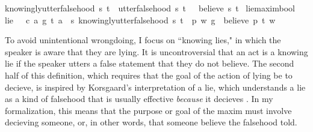 \begin{isabellebody}
{\isachardoublequoteopen}knowingly{\isacharunderscore}utter{\isacharunderscore}falsehood\ s\ t\ {\isasymequiv}\ {\isacharparenleft}utter{\isacharunderscore}falsehood\ s\ t{\isacharparenright}\ \isactrlbold {\isasymand}\ {\isacharparenleft}\isactrlbold {\isasymnot}\ {\isacharparenleft}believe\ s\ t{\isacharparenright}{\isacharparenright}{\isachardoublequoteclose}\isanewline
%
\isanewline
\isanewline
{}\isamarkupfalse%
\ lie{\isacharcolon}{\isacharcolon}{\isachardoublequoteopen}maxim{\isasymRightarrow}bool{\isachardoublequoteclose}\ \ \isanewline
{\isachardoublequoteopen}lie\ {\isasymequiv}\ {\isasymlambda}\ {\isacharparenleft}c{\isacharcomma}\ a{\isacharcomma}\ g{\isacharparenright}{\isachardot}\ {\isasymexists}t{\isachardot}\ {\isacharparenleft}a\ \isactrlbold {\isasymlongrightarrow}\ {\isacharparenleft}{\isasymlambda}s{\isachardot}\ knowingly{\isacharunderscore}utter{\isacharunderscore}falsehood\ s\ t{\isacharparenright}{\isacharparenright}\ {\isasymand}\ {\isacharparenleft}{\isasymexists}p{\isachardot}\ {\isasymforall}w{\isachardot}\ {\isacharparenleft}g\ \isactrlbold {\isasymrightarrow}\ believe\ p\ t{\isacharparenright}\ w{\isacharparenright}{\isachardoublequoteclose}\isanewline
%
%
\begin{isamarkuptext}%
To avoid unintentional wrongdoing, I focus on ``knowing lies," 
in which the speaker is aware that they are lying. It is uncontroversial that an act is a knowing lie
if the speaker utters a false statement that they do not believe. The second half of this definition, which 
requires that the goal of the action of lying be to decieve, is inspired by  Korsgaard's interpretation 
of a lie, which understands a lie as a kind of falsehood that is usually effective \emph{because} it decieves
\citep[4]{KorsgaardRTL}. In my formalization, this means that the purpose or goal of the maxim must
involve decieving someone, or, in other words, that someone believe the falsehood told.%
\end{isamarkuptext}\isamarkuptrue%
%
\begin{isamarkuptext}%

\end{isamarkuptext}
\end{isabellebody}
